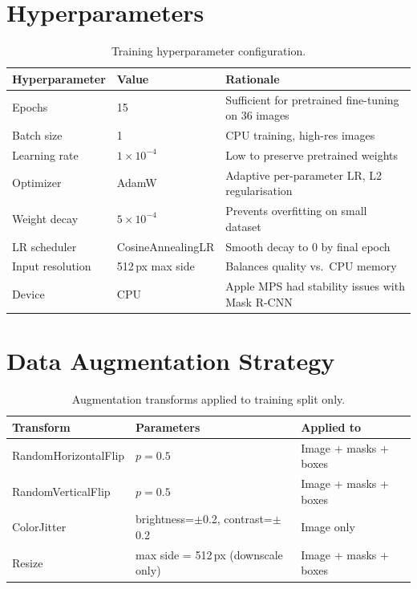 \documentclass[12pt, a4paper, twoside]{report}
\begin{document}
\section{Hyperparameters}

\begin{table}[H]
\centering
\caption{Training hyperparameter configuration.}
\label{tab:hyperparams}
\begin{tabular}{lll}
\toprule
\textbf{Hyperparameter} & \textbf{Value} & \textbf{Rationale} \\
\midrule
Epochs          & 15               & Sufficient for pretrained fine-tuning on 36 images \\
Batch size      & 1                & CPU training, high-res images \\
Learning rate   & $1 \times 10^{-4}$ & Low to preserve pretrained weights \\
Optimizer       & AdamW            & Adaptive per-parameter LR, L2 regularisation \\
Weight decay    & $5 \times 10^{-4}$ & Prevents overfitting on small dataset \\
LR scheduler    & CosineAnnealingLR & Smooth decay to 0 by final epoch \\
Input resolution & 512\,px max side & Balances quality vs.\ CPU memory \\
Device          & CPU              & Apple MPS had stability issues with Mask R-CNN \\
\bottomrule
\end{tabular}
\end{table}

\section{Data Augmentation Strategy}

\begin{table}[H]
\centering
\caption{Augmentation transforms applied to training split only.}
\label{tab:augmentation}
\begin{tabular}{lll}
\toprule
\textbf{Transform} & \textbf{Parameters} & \textbf{Applied to} \\
\midrule
RandomHorizontalFlip & $p = 0.5$ & Image + masks + boxes \\
RandomVerticalFlip   & $p = 0.5$ & Image + masks + boxes \\
ColorJitter          & brightness=$\pm$0.2, contrast=$\pm$0.2 & Image only \\
Resize               & max side = 512\,px (downscale only) & Image + masks + boxes \\
\bottomrule
\end{tabular}
\end{table}
\end{document}
